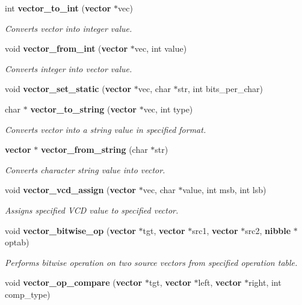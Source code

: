 \begin{CompactItemize}
int {\bf vector\_\-to\_\-int} ({\bf vector} $\ast$vec)
\begin{CompactList}\small\item\em Converts vector into integer value. \item\end{CompactList}\item 
void {\bf vector\_\-from\_\-int} ({\bf vector} $\ast$vec, int value)
\begin{CompactList}\small\item\em Converts integer into vector value. \item\end{CompactList}\item 
void {\bf vector\_\-set\_\-static} ({\bf vector} $\ast$vec, char $\ast$str, int bits\_\-per\_\-char)
\item 
char $\ast$ {\bf vector\_\-to\_\-string} ({\bf vector} $\ast$vec, int type)
\begin{CompactList}\small\item\em Converts vector into a string value in specified format. \item\end{CompactList}\item 
{\bf vector} $\ast$ {\bf vector\_\-from\_\-string} (char $\ast$str)
\begin{CompactList}\small\item\em Converts character string value into vector. \item\end{CompactList}\item 
void {\bf vector\_\-vcd\_\-assign} ({\bf vector} $\ast$vec, char $\ast$value, int msb, int lsb)
\begin{CompactList}\small\item\em Assigns specified VCD value to specified vector. \item\end{CompactList}\item 
void {\bf vector\_\-bitwise\_\-op} ({\bf vector} $\ast$tgt, {\bf vector} $\ast$src1, {\bf vector} $\ast$src2, {\bf nibble} $\ast$optab)
\begin{CompactList}\small\item\em Performs bitwise operation on two source vectors from specified operation table. \item\end{CompactList}\item 
void {\bf vector\_\-op\_\-compare} ({\bf vector} $\ast$tgt, {\bf vector} $\ast$left, {\bf vector} $\ast$right, int comp\_\-type)

\end{CompactItemize}
